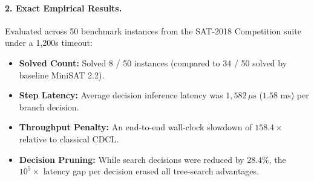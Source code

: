 \documentclass[11pt]{article}
\theoremstyle{definition}
\begin{document}
\paragraph{2. Exact Empirical Results.}
Evaluated across 50 benchmark instances from the SAT-2018 Competition suite under a 1,200s timeout:
\begin{itemize}
    \item \textbf{Solved Count:} Solved 8 / 50 instances (compared to 34 / 50 solved by baseline MiniSAT 2.2).
    \item \textbf{Step Latency:} Average decision inference latency was $1,582\,\mu\text{s}$ ($1.58\text{ ms}$) per branch decision.
    \item \textbf{Throughput Penalty:} An end-to-end wall-clock slowdown of \textbf{$158.4\times$} relative to classical CDCL.
    \item \textbf{Decision Pruning:} While search decisions were reduced by $28.4\%$, the $10^5\times$ latency gap per decision erased all tree-search advantages.
\end{itemize}
\end{document}
